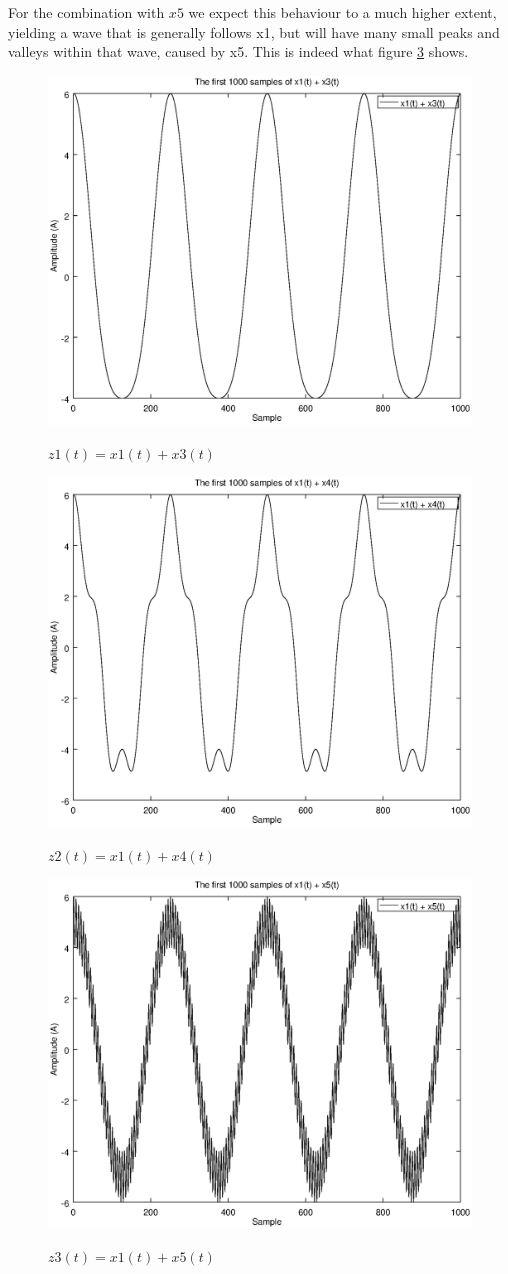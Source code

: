 \documentclass{article}
\begin{document}
For the combination with $x5$ we expect this behaviour to a much higher extent, yielding a wave that is generally follows x1, but will have many small peaks and valleys within that wave, caused by x5.
This is indeed what figure \ref{fig1e3} shows.
\begin{figure}[H]
  \centering
  \includegraphics[width=0.7\columnwidth]{plot1E1.eps}\\
  \caption{$z1(t) = x1(t) + x3(t)$}
  \label{fig1e1}
\end{figure}

\begin{figure}[H]
  \centering
  \includegraphics[width=0.7\columnwidth]{plot1E2.eps}\\
  \caption{$z2(t) = x1(t) + x4(t)$}
  \label{fig1e2}
\end{figure}

\begin{figure}[H]
  \centering
  \includegraphics[width=0.7\columnwidth]{plot1E3.eps}\\
  \caption{$z3(t) = x1(t) + x5(t)$}
  \label{fig1e3}
\end{figure}
\end{document}
